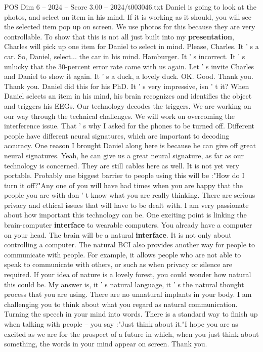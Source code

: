 \begin{textsample}{POS Dim 6 – 2024 – Score 3.00 – 2024/t003046.txt}
Daniel is going to look at the photos, and select an item in his mind.
If it is working as it should, you will see the selected item pop up on screen.
We use photos for this because they are very controllable.
To show that this is not all just built into my \textbf{presentation}, Charles will pick up one item for Daniel to select in mind.
Please, Charles.
It ' s a car.
So, Daniel, select... the car in his mind.
Hamburger.
It ' s incorrect.
It ' s unlucky that the 30-percent error rate came with us again.
Let ' s invite Charles and Daniel to show it again.
It ' s a duck, a lovely duck.
OK.
Good.
Thank you.
Thank you.
Daniel did this for his PhD.
It ' s very impressive, isn ' t it?
When Daniel selects an item in his mind, his brain recognizes and identifies the object and triggers his EEGs.
Our technology decodes the triggers.
We are working on our way through the technical challenges.
We will work on overcoming the interference issue.
That ' s why I asked for the phones to be turned off.
Different people have different neural signatures, which are important to decoding accuracy.
One reason I brought Daniel along here is because he can give off great neural signatures.
Yeah, he can give us a great neural signature, as far as our technology is concerned.
They are still cables here as well.
It is not yet very portable.
Probably one biggest barrier to people using this will be :"How do I turn it off?"Any one of you will have had times when you are happy that the people you are with don ' t know what you are really thinking.
There are serious privacy and ethical issues that will have to be dealt with.
I am very passionate about how important this technology can be.
One exciting point is linking the brain-computer \textbf{interface} to wearable computers.
You already have a computer on your head.
The brain will be a natural \textbf{interface}.
It is not only about controlling a computer.
The natural BCI also provides another way for people to communicate with people.
For example, it allows people who are not able to speak to communicate with others, or such as when privacy or silence are required.
If your idea of nature is a lovely forest, you could wonder how natural this could be.
My answer is, it ' s natural language, it ' s the natural thought process that you are using.
There are no unnatural implants in your body.
I am challenging you to think about what you regard as natural communication.
Turning the speech in your mind into words.
There is a standard way to finish up when talking with people -- you say :"Just think about it."I hope you are as excited as we are for the prospect of a future in which, when you just think about something, the words in your mind appear on screen.
Thank you.

\end{textsample}
